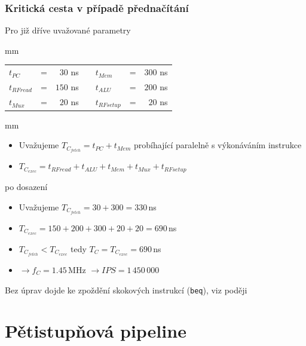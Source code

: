 \documentclass{beamer}
\begin{document}
\begin{frame}
\frametitle{Kritická cesta v případě přednačítání}

Pro již dříve uvažované parametry

 mm

\begin{tabular}{l c r m{1 cm} l c r}
$t_{PC}$ & = & $30$ ns & & $t_{Mem}$ & = & $300$ ns \\
$t_{RFread}$ & = & $150$ ns  & & $t_{ALU}$ & = & $200$ ns \\
$t_{Mux}$ & = & $20$ ns  & & $t_{RFsetup}$ & = & $20$ ns \\
\end{tabular}

 mm

\begin{itemize}
 \item Uvažujeme $T_{C_{fetch}} =  t_{PC} + t_{Mem}$ probíhající paralelně s výkonáváním instrukce
 \item $T_{C_{exec}} = t_{RFread} + t_{ALU} + t_{Mem} + t_{Mux} + t_{RFsetup}$
\end{itemize}

po dosazení

\begin{itemize}
 \item Uvažujeme $T_{C_{fetch}} =  30 + 300 = 330$\,ns
 \item $T_{C_{exec}} = 150 + 200 + 300 + 20 + 20 = 690$\,ns
 \item $T_{C_{fetch}} < T_{C_{exec}}$ tedy $T_{C} = T_{C_{exec}} = 690$\,ns
 \item $\rightarrow f_{C} = 1.45$\,MHz $\rightarrow IPS = 1\,450\,000$
\end{itemize}

Bez úprav dojde ke zpoždění skokových instrukcí (\texttt{beq}), viz poději

\end{frame}

\section{Pětistupňová pipeline}
\end{document}
